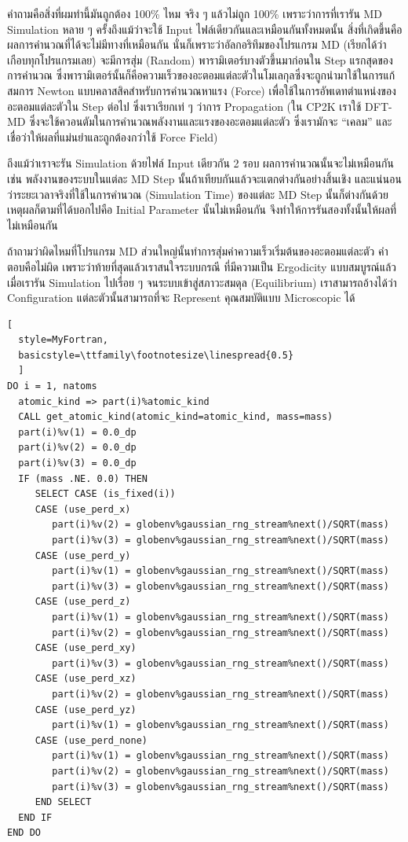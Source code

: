 คำถามคือสิ่งที่ผมทำนี้มันถูกต้อง 100\% ไหม จริง ๆ แล้วไม่ถูก 100\% เพราะว่าการที่เรารัน MD Simulation หลาย ๆ ครั้งถึงแม้ว่าจะใช้ Input
ไฟล์เดียวกันและเหมือนกันทั้งหมดนั้น สิ่งที่เกิดขึ้นคือผลการคำนวณที่ได้จะไม่มีทางที่เหมือนกัน นั่นก็เพราะว่าอัลกอริทึมของโปรแกรม MD
(เรียกได้ว่าเกือบทุกโปรแกรมเลย) จะมีการสุ่ม (Random) พารามิเตอร์บางตัวขึ้นมาก่อนใน Step แรกสุดของการคำนวณ
ซึ่งพารามิเตอร์นั้นก็คือความเร็วของอะตอมแต่ละตัวในโมเลกุลซึ่งจะถูกนำมาใช้ในการแก้สมการ Newton แบบคลาสสิคสำหรับการคำนวณหาแรง (Force)
เพื่อใช้ในการอัพเดทตำแหน่งของอะตอมแต่ละตัวใน Step ต่อไป ซึ่งเราเรียกเท่ ๆ ว่าการ Propagation
(ใน CP2K เราใช้ DFT-MD ซึ่งจะใช้ควอนตัมในการคำนวณพลังงานและแรงของอะตอมแต่ละตัว ซึ่งเรามักจะ \enquote{เคลม}
และเชื่อว่าให้ผลที่แม่นยำและถูกต้องกว่าใช้ Force Field)

ถึงแม้ว่าเราจะรัน Simulation ด้วยไฟล์ Input เดียวกัน 2 รอบ ผลการคำนวณนั้นจะไม่เหมือนกัน เช่น พลังงานของระบบในแต่ละ MD Step
นั้นถ้าเทียบกันแล้วจะแตกต่างกันอย่างสิ้นเชิง และแน่นอนว่าระยะเวลาจริงที่ใช้ในการคำนวณ (Simulation Time) ของแต่ละ MD Step นั้นก็ต่างกันด้วย
เหตุผลก็ตามที่ได้บอกไปคือ Initial Parameter นั้นไม่เหมือนกัน จึงทำให้การรันสองทั้งนั้นให้ผลที่ไม่เหมือนกัน

ถ้าถามว่าผิดไหมที่โปรแกรม MD ส่วนใหญ่นั้นทำการสุ่มค่าความเร็วเริ่มต้นของอะตอมแต่ละตัว คำตอบคือไม่ผิด เพราะว่าท้ายที่สุดแล้วเราสนใจระบบกรณี%
ที่มีความเป็น Ergodicity แบบสมบูรณ์แล้ว เมื่อเรารัน Simulation ไปเรื่อย ๆ จนระบบเข้าสู่สภาวะสมดุล (Equilibrium) เราสามารถอ้างได้ว่า
Configuration แต่ละตัวนั้นสามารถที่จะ Represent คุณสมบัติแบบ Microscopic ได้

\vspace{5pt}

\begin{lstlisting}[
  style=MyFortran,
  basicstyle=\ttfamily\footnotesize\linespread{0.5}
  ]
DO i = 1, natoms
  atomic_kind => part(i)%atomic_kind
  CALL get_atomic_kind(atomic_kind=atomic_kind, mass=mass)
  part(i)%v(1) = 0.0_dp
  part(i)%v(2) = 0.0_dp
  part(i)%v(3) = 0.0_dp
  IF (mass .NE. 0.0) THEN
     SELECT CASE (is_fixed(i))
     CASE (use_perd_x)
        part(i)%v(2) = globenv%gaussian_rng_stream%next()/SQRT(mass)
        part(i)%v(3) = globenv%gaussian_rng_stream%next()/SQRT(mass)
     CASE (use_perd_y)
        part(i)%v(1) = globenv%gaussian_rng_stream%next()/SQRT(mass)
        part(i)%v(3) = globenv%gaussian_rng_stream%next()/SQRT(mass)
     CASE (use_perd_z)
        part(i)%v(1) = globenv%gaussian_rng_stream%next()/SQRT(mass)
        part(i)%v(2) = globenv%gaussian_rng_stream%next()/SQRT(mass)
     CASE (use_perd_xy)
        part(i)%v(3) = globenv%gaussian_rng_stream%next()/SQRT(mass)
     CASE (use_perd_xz)
        part(i)%v(2) = globenv%gaussian_rng_stream%next()/SQRT(mass)
     CASE (use_perd_yz)
        part(i)%v(1) = globenv%gaussian_rng_stream%next()/SQRT(mass)
     CASE (use_perd_none)
        part(i)%v(1) = globenv%gaussian_rng_stream%next()/SQRT(mass)
        part(i)%v(2) = globenv%gaussian_rng_stream%next()/SQRT(mass)
        part(i)%v(3) = globenv%gaussian_rng_stream%next()/SQRT(mass)
     END SELECT
  END IF
END DO
\end{lstlisting}

